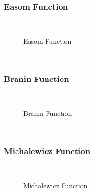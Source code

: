 \subsubsection{Easom Function}
~
\begin{figure}[ht]
	\centering
	\setlength \fboxsep{0pt}
	\setlength \fboxrule{0.5pt}
	\caption{Easom Function}
	\label{fig:EasomGraph}
\end{figure}
~
\subsubsection{Branin Function}
~
\begin{figure}[ht]
	\centering
	\setlength \fboxsep{0pt}
	\setlength \fboxrule{0.5pt}
	\caption{Branin Function}
	\label{fig:BraninGraph}
\end{figure}
~
\subsubsection{Michalewicz Function}
~
\begin{figure}[ht]
	\centering
	\setlength \fboxsep{0pt}
	\setlength \fboxrule{0.5pt}
	\caption{Michalewicz Function}
	\label{fig:MichalewiczGraph}
\end{figure}
~
